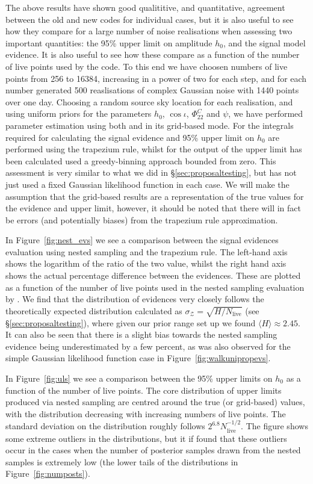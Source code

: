 The above results have shown good qualititive, and quantitative, agreement between the old and new codes for individual cases, but it is also useful
to see how they compare for a large number of noise realisations when assessing two important quantities: the 95\% upper limit on \gw amplitude $h_0$,
and the signal model evidence. It is also useful to see how these compare as a function of the number of live points used by the code. To this end we
have choosen numbers of live points from 256 to 16384, increasing in a power of two for each step, and for each number generated 500 reaslisations of
complex Gaussian noise with 1440 points over one day. Choosing a random source sky location for each realisation, and using uniform priors for the
parameters $h_0$, $\cos{\iota}$, $\Phi_{22}^C$ and $\psi$, we have performed parameter estimation using both \lppen and \lppe in its grid-based mode.
For \lppe the integrals required for calculating the signal evidence and 95\% upper limit on $h_0$ are performed using the trapezium rule, whilst
for the output of \lppen the upper limit has been calculated used a greedy-binning approach bounded from zero. This assessment is very similar to what
we did in \S\ref{sec:proposaltesting}, but has not just used a fixed Gaussian likelihood function in each case. We will make the assumption that the
grid-based results are a representation of the true values for the evidence and upper limit, however, it should be noted that there will in fact be
errors (and potentially biases) from the trapezium rule approximation.

In Figure~\ref{fig:nest_evs} we see a comparison between the signal evidences evaluation using nested sampling and the trapezium rule. The left-hand
axis shows the logarithm of the ratio of the two value, whilst the right hand axis shows the actual percentage difference between the evidences. These
are plotted as a function of the number of live points used in the nested sampling evaluation by \lppen. We find that the distribution of evidences
very closely follows the theoretically expected distribution calculated as $\sigma_{\mathcal{Z}} = \sqrt{H/N_{\text{live}}}$ (see
\S\ref{sec:proposaltesting}), where given our prior range set up we found $\langle H \rangle \approx 2.45$. It can also be seen that there is a slight
bias towards the nested sampling evidence being underestimated by a few percent, as was also observed for the simple Gaussian likelihood function case
in Figure~\ref{fig:walkunipropevs}.

In Figure~\ref{fig:uls} we see a comparison between the 95\% upper limits on $h_0$ as a function of the number of live points. The core distribution of upper
limits produced via nested sampling are centred around the true (or grid-based) values, with the distribution decreasing with increasing numbers of live points.
The standard deviation on the distribution roughly follows $2^{6.8}N_{\text{live}}^{-1/2}$. The figure shows some extreme outliers in the distributions, but it
if found that these outliers occur in the cases when the number of posterior samples drawn from the nested samples is extremely low (the lower tails of the
distributions in Figure~\ref{fig:numposts}).

